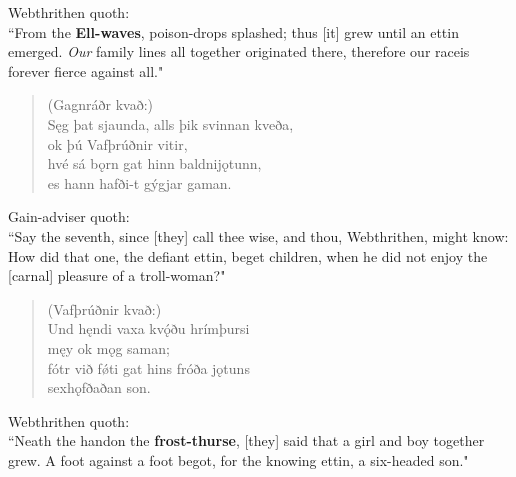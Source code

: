 \bvb Webthrithen quoth: \\ “From the \textbf{Ell-waves}, poison-drops splashed; thus [it] grew until an ettin emerged. \emph{Our} family lines all together originated there, therefore our race\footnotemark[45] is forever fierce against all.\footnotemark[46]" \\

\begin{verse}
(Gagnráðr kvað:) \\%
\bva Sęg þat sjaunda, \hld alls þik svinnan kveða, \\%
\ind ok þú Vafþrúðnir vitir, \\%
hvé sá bǫrn gat \hld hinn baldni\footnotemark[25] jǫtunn, \\%
\ind es hann hafði-t gýgjar gaman.\\%
\end{verse}

\bvb Gain-adviser quoth: \\ “Say the seventh, since [they] call thee wise, and thou, Webthrithen, might know: How did that one, the defiant ettin, beget children, when he did not enjoy the [carnal] pleasure of a troll-woman?" \\

\begin{verse}
(Vafþrúðnir kvað:) \\%
\bva Und hęndi vaxa \hld kvǫ́ðu hrímþursi \\%
\ind męy ok mǫg saman; \\%
fótr við fǿti \hld gat hins fróða jǫtuns \\%
\ind sexhǫfðaðan son.\\%
\end{verse}

\bvb Webthrithen quoth: \\ “Neath the hand\footnotemark[50] on the \textbf{frost-thurse}, [they] said that a girl and boy together grew. A foot against a foot begot, for the knowing ettin, a six-headed son." \\

